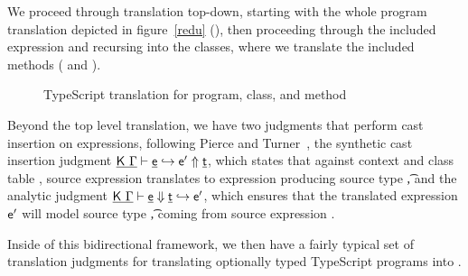 \documentclass[a4paper,USenglish]{tex/lipics-v2016}
\begin{document}
We proceed through translation top-down, starting with the whole program 
translation depicted in figure~\ref{redu} (), then proceeding 
through the included expression and recursing into the classes, where we 
translate the included methods ( and ).

\begin{figure}[!h]
\begin{mathpar}



\end{mathpar}
\caption{TypeScript translation for program, class, and method}
\label{fig:tstrans_cla}
\end{figure}

Beyond the top level translation, we have two judgments that perform cast 
insertion on expressions, following Pierce and Turner~\cite{pierce:1998:local},
the synthetic cast insertion judgment $\GenCast\K\Env\e\ep\t$, which states that
against context \Env and class table \K, source expression \e translates to
\kafka expression \ep producing source type \t, and the analytic judgment
$\AnaCast\K\Env\e\ep\t$, which ensures that the translated \kafka expression 
$\ep$ will model source type \t, coming from source expression \e.

Inside of this bidirectional framework, we then have a fairly typical set of
translation judgments for translating optionally typed TypeScript programs into
\kafka.
\end{document}
